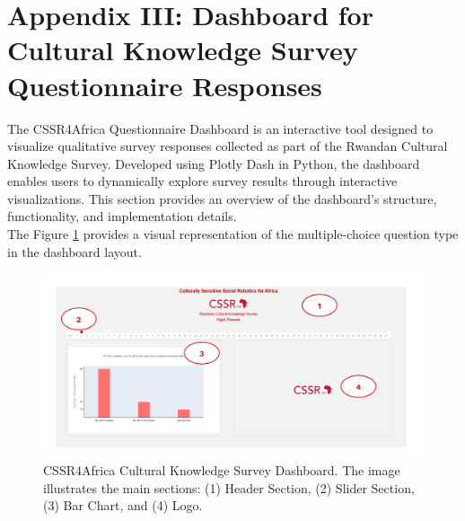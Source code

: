 \documentclass{CSSRforAfrica}
\begin{document}
\newpage
\section*{Appendix III: Dashboard for Cultural Knowledge Survey Questionnaire Responses}
\label{section: appendixiii}
The CSSR4Africa Questionnaire Dashboard is an interactive tool designed to visualize qualitative survey responses collected as part of the Rwandan Cultural Knowledge Survey. Developed using Plotly Dash in Python, the dashboard enables users to dynamically explore survey results through interactive visualizations. This section provides an overview of the dashboard's structure, functionality, and implementation details.\\
The Figure \ref{fig:dashboard3} provides a visual representation of the multiple-choice question type in the dashboard layout.
\begin{figure}[H]
    \centering
    \includegraphics[width=\textwidth]{dashboard3.png} 
    \caption{CSSR4Africa Cultural Knowledge Survey Dashboard. The image illustrates the main sections: (1) Header Section, (2) Slider Section, (3) Bar Chart, and (4) Logo.}
    \label{fig:dashboard3}
\end{figure}
\end{document}
